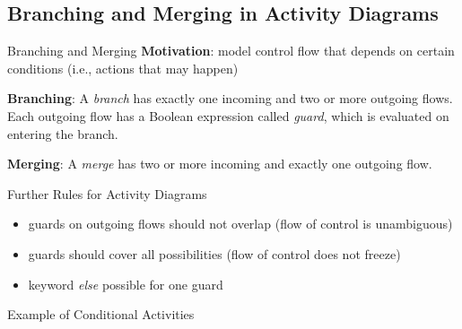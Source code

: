 \subsection{Branching and Merging in Activity Diagrams}
\begin{frame}{\insertsubsection}
	\begin{fancycolumns}[animation=none]
		\nextcolumn
		\begin{definition}{{Branching and Merging \mysource{\umluserguide}}}
			\textbf{Motivation}: model control flow that depends on certain conditions (i.e., actions that may happen)
			
			\textbf{Branching}: A \emph{branch} has exactly one incoming and two or more outgoing flows. Each outgoing flow has a Boolean expression called \emph{guard}, which is evaluated on entering the branch. 
			
			\textbf{Merging}: A \emph{merge} has two or more incoming and exactly one outgoing flow. 
		\end{definition}
		\pause
		\begin{note}{Further Rules for Activity Diagrams}
			\begin{itemize}
				\item guards on outgoing flows should not overlap (flow of control is unambiguous)
				\item guards should cover all possibilities (flow of control does not freeze)
				\item keyword \emph{else} possible for one guard 
			\end{itemize}
		\end{note}
	\end{fancycolumns}
\end{frame}

\begin{frame}{Example of Conditional Activities}
\end{frame}

